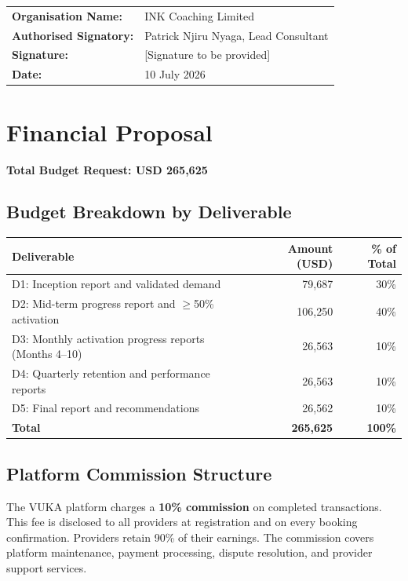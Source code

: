 \documentclass[11pt,a4paper]{article}
\begin{document}
\vspace{1cm}

\begin{tabular}{ll}
\textbf{Organisation Name:} & INK Coaching Limited \\
\textbf{Authorised Signatory:} & Patrick Njiru Nyaga, Lead Consultant \\
\textbf{Signature:} & [Signature to be provided] \\
\textbf{Date:} & 10 July 2026 \\
\end{tabular}

\newpage

\section{Financial Proposal}
\noindent \textbf{Total Budget Request: USD 265,625}

\subsection{Budget Breakdown by Deliverable}
\begin{longtable}{@{}lrr@{}}
\textbf{Deliverable} & \textbf{Amount (USD)} & \textbf{\% of Total} \\
\hline
D1: Inception report and validated demand & 79,687 & 30\% \\
D2: Mid-term progress report and $\geq$50\% activation & 106,250 & 40\% \\
D3: Monthly activation progress reports (Months 4--10) & 26,563 & 10\% \\
D4: Quarterly retention and performance reports & 26,563 & 10\% \\
D5: Final report and recommendations & 26,562 & 10\% \\
\hline
\textbf{Total} & \textbf{265,625} & \textbf{100\%} \\
\end{longtable}

\subsection{Platform Commission Structure}
\noindent The VUKA platform charges a \textbf{10\% commission} on completed transactions. This fee is disclosed to all providers at registration and on every booking confirmation. Providers retain 90\% of their earnings. The commission covers platform maintenance, payment processing, dispute resolution, and provider support services.
\end{document}
